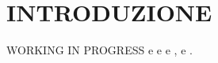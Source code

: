 \chapter*{INTRODUZIONE}
{}
WORKING IN PROGRESS \cite[vedi][]{vpmcm:code} e \cite[vedi][23]{giga:main} e
\cite[vedi][cp 3]{gui:sapiro} e \cite[vedi][cp 3-5]{fed:drag}, \cite[vedi][]{fed:drag,giga:main,crand:lion,yun:giga} e \cite[vedi][]{bi:chow,dog:noch}.

